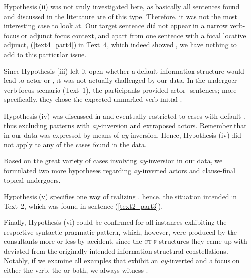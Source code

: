 \documentclass[output=paper,
,modfonts
,nonflat]{langsci/langscibook}
\begin{document}
  

\noindent Hypothesis (ii) was not truly investigated here, as basically all  sentences found and discussed in the literature are of this type. Therefore, it was not the most interesting case to look at. Our target sentence did not appear in a narrow verb-focus or adjunct focus context, and apart from one sentence with a focal locative adjunct, (\ref{text4_part4}) in Text~4, which indeed showed , we have nothing to add to this particular issue. 


\noindent Since Hypothesis (iii) left it open whether a default information structure would lead to actor or , it was not actually challenged by our data. In the undergoer-verb-focus scenario (Text~1), the participants provided actor- sentences; more specifically, they chose 
the expected unmarked verb-initial .


\noindent Hypothesis (iv) was discussed in  and eventually restricted to cases with default , thus excluding patterns with \textit{ay-}inversion and extraposed actors. Remember that  in our data was expressed by means of \textit{ay-}inversion. Hence, Hypothesis (iv) did not apply to any of the cases found in the data.

Based on the great variety of cases involving \textit{ay}-inversion in our data, we formulated two more hypotheses regarding \textit{ay}-inverted actors and clause-final topical undergoers.


\noindent Hypothesis (v) specifies one way of realizing , hence, the situation intended in Text~2, which was found in sentence (\ref{text2_part3}).


\noindent Finally, Hypothesis (vi) could be confirmed for all instances exhibiting the respective syntactic-pragmatic pattern, which, however, were produced by the consultants more or less by accident, since the \textsc{ct-f} structures they came up with deviated from the originally intended in\-for\-ma\-tion-struc\-tu\-ral constellations. Notably, if we examine all examples that exhibit an \textit{ay}-inverted  and a focus on either the verb, the  or both, we always witness . 
\end{document}

